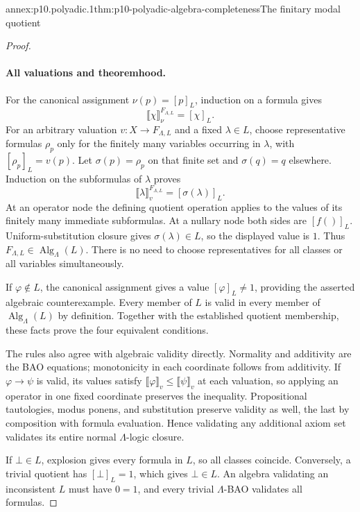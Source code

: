 \begin{annexitem}{annex:p10.polyadic.1}{thm:p10-polyadic-algebra-completeness}{The finitary modal quotient}
\begin{proof}
\paragraph{All valuations and theoremhood.}
For the canonical assignment \(\nu(p)=[p]_L\), induction on a
formula gives
\[
 \llbracket\chi\rrbracket_\nu^{F_{\Lambda,L}}=[\chi]_L.
\]
For an arbitrary valuation \(v:X\to F_{\Lambda,L}\) and a fixed
\(\lambda\in L\), choose representative formulas \(\rho_p\) only
for the finitely many variables occurring in \(\lambda\), with
\([\rho_p]_L=v(p)\).
Let \(\sigma(p)=\rho_p\) on that finite set and
\(\sigma(q)=q\) elsewhere.
Induction on the subformulas of \(\lambda\) proves
\[
 \llbracket\lambda\rrbracket_v^{F_{\Lambda,L}}
                  =[\sigma(\lambda)]_L.
\]
At an operator node the defining quotient operation applies to
the values of its finitely many immediate subformulas.
At a nullary node both sides are \([f()]_L\).
Uniform-substitution closure gives \(\sigma(\lambda)\in L\), so
the displayed value is \(1\).
Thus \(F_{\Lambda,L}\in\operatorname{Alg}_\Lambda(L)\).
There is no need to choose representatives for all classes or all
variables simultaneously.

If \(\varphi\notin L\), the canonical assignment gives a value
\([\varphi]_L\ne1\), providing the asserted algebraic counterexample.
Every member of \(L\) is valid in every member of
\(\operatorname{Alg}_\Lambda(L)\) by definition.
Together with the established quotient membership, these facts
prove the four equivalent conditions.

The rules also agree with algebraic validity directly.
Normality and additivity are the BAO equations; monotonicity in
each coordinate follows from additivity.
If \(\varphi\to\psi\) is valid, its values satisfy
\(\llbracket\varphi\rrbracket_v\leq\llbracket\psi\rrbracket_v\)
at each valuation, so applying an operator in one fixed coordinate
preserves the inequality.
Propositional tautologies, modus ponens, and substitution preserve
validity as well, the last by composition with formula evaluation.
Hence validating any additional axiom set validates its entire
normal \(\Lambda\)-logic closure.

If \(\bot\in L\), explosion gives every formula in \(L\), so all
classes coincide.  Conversely, a trivial quotient has
\([\bot]_L=1\), which gives \(\bot\in L\).
An algebra validating an inconsistent \(L\) must have \(0=1\),
and every trivial \(\Lambda\)-BAO validates all formulas.


\end{proof}
\end{annexitem}

